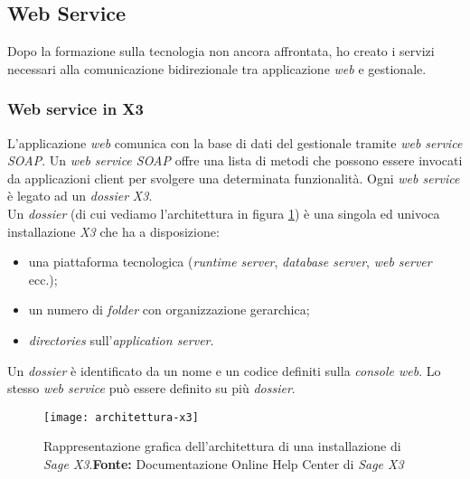 
\subsection{Web Service}
Dopo la formazione sulla tecnologia non ancora affrontata, ho creato i servizi
necessari alla comunicazione bidirezionale tra applicazione \textit{web} e gestionale.

\subsubsection{Web service in X3}
L'applicazione \textit{web} comunica con la base di dati del gestionale tramite \textit{web service SOAP}.
Un \textit{web service SOAP} offre una lista di metodi che possono essere invocati da applicazioni client per svolgere una determinata funzionalità.
Ogni \textit{web service} è legato ad un \textit{dossier} \textit{X3}.\\
Un \textit{dossier} (di cui vediamo l'architettura in figura \ref{fig:architettura-x3}) è una singola ed univoca installazione \textit{X3} che ha a disposizione:
\begin{itemize}
	\item una piattaforma tecnologica (\textit{runtime server}, \textit{database server}, \textit{web server} ecc.);
	\item un numero di \textit{folder} con organizzazione gerarchica;
	\item \textit{directories} sull'\textit{application server}.
\end{itemize}
Un \textit{dossier} è identificato da un nome e un codice definiti sulla \textit{console web}.
Lo stesso \textit{web service} può essere definito su più \textit{dossier}.

\begin{figure}[htbp]
	\begin{center}
		\texttt{[image: architettura-x3]}
		\caption{Rappresentazione grafica dell'architettura di una installazione di \textit{Sage X3}.\newline \textbf{Fonte:} Documentazione Online Help Center di \textit{Sage X3}}
		\label{fig:architettura-x3}
	\end{center}
\end{figure}


